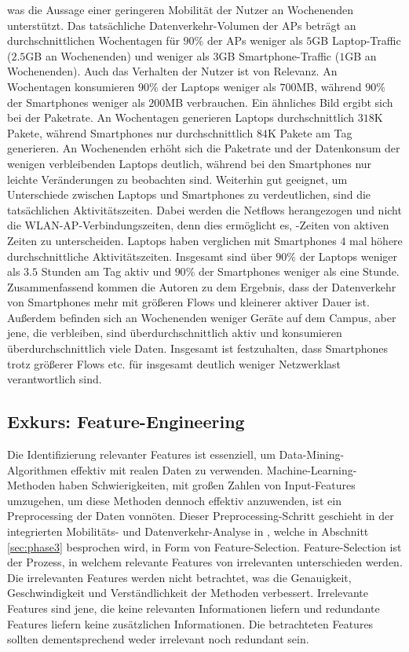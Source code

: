 \documentclass[12pt, a4paper]{article}
\begin{document}
was die Aussage einer geringeren Mobilität der Nutzer an Wochenenden unterstützt. \cite{Alipour2018}
Das tatsächliche Datenverkehr-Volumen der APs beträgt an durchschnittlichen Wochentagen für $90 \%$ der APs
weniger als $5$\textsc{GB} Laptop-Traffic ($2.5$\textsc{GB} an Wochenenden) und weniger als $3$\textsc{GB} Smartphone-Traffic
($1$\textsc{GB} an Wochenenden). Auch das Verhalten der Nutzer ist von Relevanz. An Wochentagen konsumieren $90 \%$ der 
Laptops weniger als $700$\textsc{MB}, während $90 \%$ der Smartphones weniger als $200$\textsc{MB} verbrauchen.
Ein ähnliches Bild ergibt sich bei der Paketrate. An Wochentagen generieren Laptops durchschnittlich $318$\textsc{K} Pakete, 
während Smartphones nur durchschnittlich $84$\textsc{K} Pakete am Tag generieren. 
An Wochenenden erhöht sich die Paketrate und der Datenkonsum der wenigen verbleibenden Laptops deutlich,
während bei den Smartphones nur leichte Veränderungen zu beobachten sind.
Weiterhin gut geeignet, um Unterschiede zwischen Laptops und Smartphones zu verdeutlichen, sind die tatsächlichen Aktivitätszeiten.
Dabei werden die Netflows herangezogen und nicht die WLAN-AP-Verbindungszeiten, denn dies ermöglicht es, -Zeiten
von aktiven Zeiten zu unterscheiden. Laptops haben verglichen mit Smartphones $4$ mal höhere durchschnittliche Aktivitätszeiten.
Insgesamt sind über $90 \%$ der Laptops weniger als $3.5$ Stunden am Tag aktiv und $90 \%$ der Smartphones weniger als eine Stunde.\newline
Zusammenfassend kommen die Autoren zu dem Ergebnis, dass der Datenverkehr von Smartphones mehr  mit größeren Flows und kleinerer 
aktiver Dauer ist. Außerdem befinden sich an Wochenenden weniger Geräte auf dem Campus, aber jene, die verbleiben, sind überdurchschnittlich
aktiv und konsumieren überdurchschnittlich viele Daten. Insgesamt ist festzuhalten, dass Smartphones trotz größerer Flows etc. 
für insgesamt deutlich weniger Netzwerklast verantwortlich sind.

\subsection{Exkurs: Feature-Engineering}
\label{sec:digression}

Die Identifizierung relevanter Features ist essenziell, um Data-Mining-Algorithmen effektiv mit realen Daten zu verwenden.
Machine-Learning-Methoden haben Schwierigkeiten, mit großen Zahlen von Input-Features umzugehen, 
um diese Methoden dennoch effektiv anzuwenden, ist ein Preprocessing der Daten vonnöten. \cite{Kumar2014}
Dieser Preprocessing-Schritt geschieht in der integrierten Mobilitäts- und Datenverkehr-Analyse in \cite{Alipour2018},
welche in Abschnitt \ref{sec:phase3} besprochen wird, in Form von Feature-Selection. Feature-Selection ist der Prozess,
in welchem relevante Features von irrelevanten unterschieden werden. Die irrelevanten Features werden nicht betrachtet, 
was die Genauigkeit, Geschwindigkeit und Verständlichkeit der Methoden verbessert. \cite{Kumar2014} Irrelevante Features sind jene, 
die keine relevanten Informationen liefern und redundante Features liefern keine zusätzlichen Informationen.
Die betrachteten Features sollten dementsprechend weder irrelevant noch redundant sein.
\end{document}
